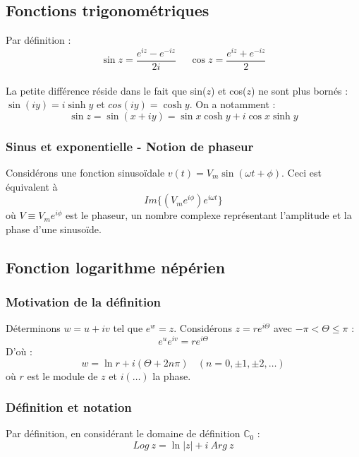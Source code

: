 \subsection{Fonctions trigonométriques}
Par définition :
\begin{equation}
	\sin z = \dfrac{e^{iz} - e^{-iz}}{2i}\ \ \ \ \ \ \cos z = \dfrac{e^{iz} + e^{-iz}}{2}
\end{equation}
\\
    
La petite différence réside dans le fait que sin($z$) et cos($z$) ne sont plus bornés : $\sin(iy) = i\sinh
y$ et $cos(iy) = \cosh y$. On a notamment :
\begin{equation}
	\sin z = \sin(x+iy) = \sin x \cosh y + i \cos x \sinh y
\end{equation}
    
\subsubsection{Sinus et exponentielle - Notion de phaseur}
Considérons une fonction sinusoïdale $v(t) = V_m\sin(\omega t + \phi)$. Ceci est équivalent à 
\begin{equation}
	Im\{(V_me^{i\phi})e^{i\omega t} \}
\end{equation}
où $V \equiv V_me^{i\phi}$ est le phaseur, un nombre complexe représentant l'amplitude et la phase
d'une sinusoïde.
        
\subsection{Fonction logarithme népérien}
\subsubsection{Motivation de la définition}
Déterminons $w = u+iv$ tel que $e^w = z$. Considérons $z = re^{i\Theta}$ avec $-\pi <\Theta \leq \pi$ :
\begin{equation}
	e^ue^{iv} = re^{i\Theta}
\end{equation}
D'où :
\begin{equation}
	w = \ln r + i(\Theta + 2n\pi)\ \ \ \ (n=0, \pm 1, \pm2,\dots)
\end{equation}
où $r$ est le module de $z$ et $i(\dots)$ la phase.
    
\subsubsection{Définition et notation}
Par définition, en considérant le domaine de définition $\mathbb{C}_0$ :
\begin{equation}
	Log\ z = \ln |z| + i\ Arg\ z
\end{equation}
\ \\
        
